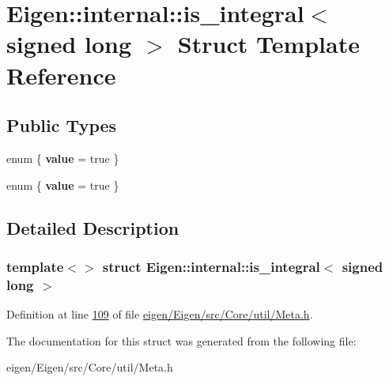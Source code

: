 \hypertarget{struct_eigen_1_1internal_1_1is__integral_3_01signed_01long_01_4}{}\section{Eigen\+:\+:internal\+:\+:is\+\_\+integral$<$ signed long $>$ Struct Template Reference}
\label{struct_eigen_1_1internal_1_1is__integral_3_01signed_01long_01_4}
\subsection*{Public Types}
\begin{DoxyCompactItemize}
\item 
\mbox{\label{struct_eigen_1_1internal_1_1is__integral_3_01signed_01long_01_4_ae15fac074524f272f5d9b92675e6f7c1}} 
enum \{ {\bfseries value} = true
 \}
\item 
\mbox{\label{struct_eigen_1_1internal_1_1is__integral_3_01signed_01long_01_4_a6bb0040f2a7b00d6ba6f58c89680a2e3}} 
enum \{ {\bfseries value} = true
 \}
\end{DoxyCompactItemize}


\subsection{Detailed Description}
\subsubsection*{template$<$$>$\newline
struct Eigen\+::internal\+::is\+\_\+integral$<$ signed long $>$}



Definition at line \hyperlink{eigen_2_eigen_2src_2_core_2util_2_meta_8h_source_l00109}{109} of file \hyperlink{eigen_2_eigen_2src_2_core_2util_2_meta_8h_source}{eigen/\+Eigen/src/\+Core/util/\+Meta.\+h}.



The documentation for this struct was generated from the following file\+:\begin{DoxyCompactItemize}
\item 
eigen/\+Eigen/src/\+Core/util/\+Meta.\+h\end{DoxyCompactItemize}
